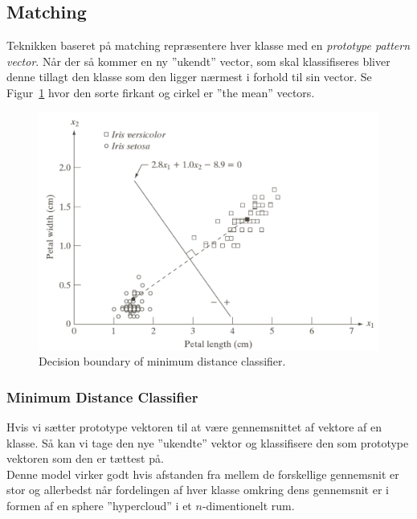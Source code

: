 \subsection{Matching}

Teknikken baseret på matching repræsentere hver klasse med en \textit{prototype pattern vector}. Når der så kommer en ny ''ukendt'' vector, som skal klassifiseres bliver denne tillagt den klasse som den ligger nærmest i forhold til sin vector. Se Figur~\ref{fig:decision-boundary} hvor den sorte firkant og cirkel er ''the mean'' vectors.

\begin{figure}[h]
	\centering
	\includegraphics[width=0.9\linewidth]{figs/spm12/decision-boundary}
	\caption{Decision boundary of minimum distance classifier.}
	\label{fig:decision-boundary}
\end{figure}

\subsubsection{Minimum Distance Classifier}

Hvis vi sætter prototype vektoren til at være gennemsnittet af vektore af en klasse. Så kan vi tage den nye ''ukendte'' vektor og klassifisere den som prototype vektoren som den er tættest på.\\

Denne model virker godt hvis afstanden fra mellem de forskellige gennemsnit er stor og allerbedst når fordelingen af hver klasse omkring dens gennemsnit er i formen af en sphere ''hypercloud'' i et $n$-dimentionelt rum.